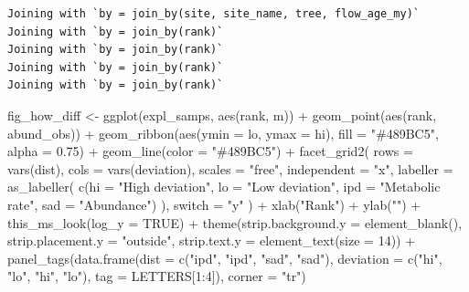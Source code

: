 \documentclass[
  letterpaper,
  DIV=11,
  numbers=noendperiod]{scrartcl}
\newenvironment{Shaded}{\begin{snugshade}}{\end{snugshade}}
\newcommand{\AttributeTok}[1]{\textcolor[rgb]{0.40,0.45,0.13}{#1}}
\newcommand{\ConstantTok}[1]{\textcolor[rgb]{0.56,0.35,0.01}{#1}}
\newcommand{\DecValTok}[1]{\textcolor[rgb]{0.68,0.00,0.00}{#1}}
\newcommand{\FloatTok}[1]{\textcolor[rgb]{0.68,0.00,0.00}{#1}}
\newcommand{\FunctionTok}[1]{\textcolor[rgb]{0.28,0.35,0.67}{#1}}
\newcommand{\NormalTok}[1]{\textcolor[rgb]{0.00,0.23,0.31}{#1}}
\newcommand{\OtherTok}[1]{\textcolor[rgb]{0.00,0.23,0.31}{#1}}
\newcommand{\SpecialCharTok}[1]{\textcolor[rgb]{0.37,0.37,0.37}{#1}}
\newcommand{\StringTok}[1]{\textcolor[rgb]{0.13,0.47,0.30}{#1}}
\begin{document}
\begin{verbatim}
Joining with `by = join_by(site, site_name, tree, flow_age_my)`
Joining with `by = join_by(rank)`
Joining with `by = join_by(rank)`
Joining with `by = join_by(rank)`
Joining with `by = join_by(rank)`
\end{verbatim}

\begin{Shaded}
\begin{Highlighting}[]
\NormalTok{fig\_how\_diff }\OtherTok{\textless{}{-}} \FunctionTok{ggplot}\NormalTok{(expl\_samps, }\FunctionTok{aes}\NormalTok{(rank, m)) }\SpecialCharTok{+}
    \FunctionTok{geom\_point}\NormalTok{(}\FunctionTok{aes}\NormalTok{(rank, abund\_obs)) }\SpecialCharTok{+}
    \FunctionTok{geom\_ribbon}\NormalTok{(}\FunctionTok{aes}\NormalTok{(}\AttributeTok{ymin =}\NormalTok{ lo, }\AttributeTok{ymax =}\NormalTok{ hi), }
                \AttributeTok{fill =} \StringTok{"\#489BC5"}\NormalTok{, }\AttributeTok{alpha =} \FloatTok{0.75}\NormalTok{) }\SpecialCharTok{+}
    \FunctionTok{geom\_line}\NormalTok{(}\AttributeTok{color =} \StringTok{"\#489BC5"}\NormalTok{) }\SpecialCharTok{+}
    \FunctionTok{facet\_grid2}\NormalTok{(}
        \AttributeTok{rows =} \FunctionTok{vars}\NormalTok{(dist), }\AttributeTok{cols =} \FunctionTok{vars}\NormalTok{(deviation), }
        \AttributeTok{scales =} \StringTok{"free"}\NormalTok{, }\AttributeTok{independent =} \StringTok{"x"}\NormalTok{, }
        \AttributeTok{labeller =} \FunctionTok{as\_labeller}\NormalTok{(}
            \FunctionTok{c}\NormalTok{(}\AttributeTok{hi =} \StringTok{"High deviation"}\NormalTok{, }\AttributeTok{lo =} \StringTok{"Low deviation"}\NormalTok{, }
              \AttributeTok{ipd =} \StringTok{"Metabolic rate"}\NormalTok{, }\AttributeTok{sad =} \StringTok{"Abundance"}\NormalTok{)}
\NormalTok{        ), }
        \AttributeTok{switch =} \StringTok{"y"}
\NormalTok{    ) }\SpecialCharTok{+}
    \FunctionTok{xlab}\NormalTok{(}\StringTok{"Rank"}\NormalTok{) }\SpecialCharTok{+}
    \FunctionTok{ylab}\NormalTok{(}\StringTok{""}\NormalTok{) }\SpecialCharTok{+}
    \FunctionTok{this\_ms\_look}\NormalTok{(}\AttributeTok{log\_y =} \ConstantTok{TRUE}\NormalTok{) }\SpecialCharTok{+}
    \FunctionTok{theme}\NormalTok{(}\AttributeTok{strip.background.y =} \FunctionTok{element\_blank}\NormalTok{(), }
          \AttributeTok{strip.placement.y =} \StringTok{"outside"}\NormalTok{,}
          \AttributeTok{strip.text.y =} \FunctionTok{element\_text}\NormalTok{(}\AttributeTok{size =} \DecValTok{14}\NormalTok{)) }\SpecialCharTok{+}
    \FunctionTok{panel\_tags}\NormalTok{(}\FunctionTok{data.frame}\NormalTok{(}\AttributeTok{dist =} \FunctionTok{c}\NormalTok{(}\StringTok{"ipd"}\NormalTok{, }\StringTok{"ipd"}\NormalTok{, }\StringTok{"sad"}\NormalTok{, }\StringTok{"sad"}\NormalTok{), }
                          \AttributeTok{deviation =} \FunctionTok{c}\NormalTok{(}\StringTok{"hi"}\NormalTok{, }\StringTok{"lo"}\NormalTok{, }\StringTok{"hi"}\NormalTok{, }\StringTok{"lo"}\NormalTok{), }
                          \AttributeTok{tag =}\NormalTok{ LETTERS[}\DecValTok{1}\SpecialCharTok{:}\DecValTok{4}\NormalTok{]), }
                \AttributeTok{corner =} \StringTok{"tr"}\NormalTok{)}


\end{Highlighting}
\end{Shaded}
\end{document}
